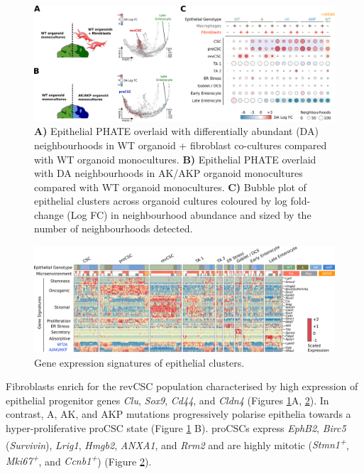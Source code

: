 \begin{figure}
    \centering
    \includegraphics{04seq/figs/4SEQ_DA.png}
    \caption{\textbf{A)} Epithelial PHATE overlaid with differentially abundant (DA) neighbourhoods in WT organoid + fibroblast co-cultures compared with WT organoid monocultures. \textbf{B)} Epithelial PHATE overlaid with DA neighbourhoods in AK/AKP organoid monocultures compared with WT organoid monocultures. \textbf{C)} Bubble plot of epithelial clusters across organoid cultures coloured by log fold-change (Log FC) in neighbourhood abundance and sized by the number of neighbourhoods detected.}
    \label{fig:4da}
\end{figure}
\begin{figure}
    \centering
    \includegraphics{04seq/figs/4SEQ_DE.png}
    \caption{Gene expression signatures of epithelial clusters.}
    \label{fig:4de}
\end{figure}

Fibroblasts enrich for the revCSC population characterised by high expression of epithelial progenitor genes \textit{Clu}, \textit{Sox9}, \textit{Cd44}, and \textit{Cldn4} (Figures \ref{fig:4da}A, \ref{fig:4de}). In contrast, A, AK, and AKP mutations progressively polarise epithelia towards a hyper-proliferative proCSC state (Figure \ref{fig:4da} B). proCSCs express \textit{EphB2}, \textit{Birc5} (\textit{Survivin}), \textit{Lrig1}, \textit{Hmgb2}, \textit{ANXA1}, and \textit{Rrm2} and are highly mitotic (\textit{Stmn1\textsuperscript{+}}, \textit{Mki67\textsuperscript{+}}, and \textit{Ccnb1\textsuperscript{+}}) (Figure \ref{fig:4de}). 

